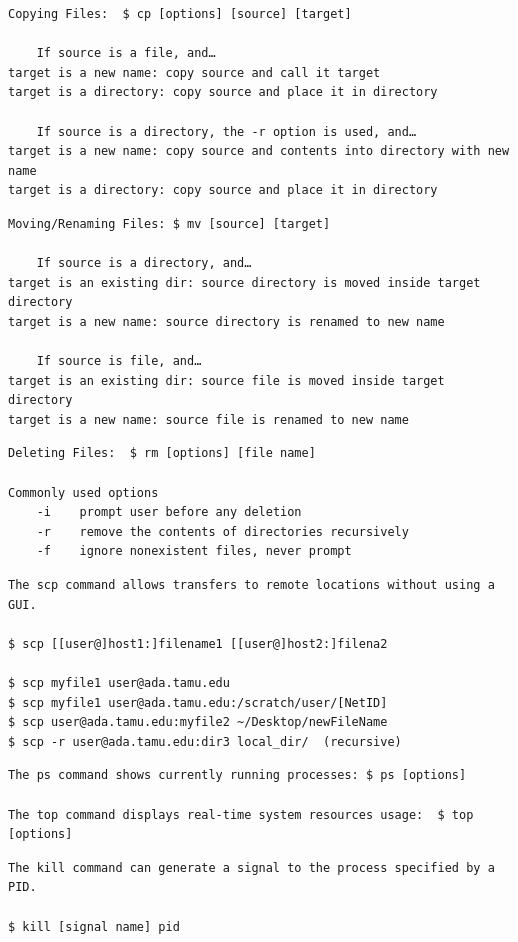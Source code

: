 \begin{verbatim}
Copying Files:  $ cp [options] [source] [target]

	If source is a file, and…
target is a new name: copy source and call it target
target is a directory: copy source and place it in directory

	If source is a directory, the -r option is used, and…
target is a new name: copy source and contents into directory with new name
target is a directory: copy source and place it in directory
\end{verbatim}


\begin{verbatim}
Moving/Renaming Files: $ mv [source] [target]

	If source is a directory, and…
target is an existing dir: source directory is moved inside target directory
target is a new name: source directory is renamed to new name

	If source is file, and…
target is an existing dir: source file is moved inside target directory
target is a new name: source file is renamed to new name
\end{verbatim}


\begin{verbatim}
Deleting Files:  $ rm [options] [file name]

Commonly used options
	-i    prompt user before any deletion
	-r    remove the contents of directories recursively
	-f    ignore nonexistent files, never prompt
\end{verbatim}

\begin{Verbatim}
The scp command allows transfers to remote locations without using a GUI. 

$ scp [[user@]host1:]filename1 [[user@]host2:]filena2

$ scp myfile1 user@ada.tamu.edu
$ scp myfile1 user@ada.tamu.edu:/scratch/user/[NetID]
$ scp user@ada.tamu.edu:myfile2 ~/Desktop/newFileName
$ scp -r user@ada.tamu.edu:dir3 local_dir/  (recursive) 
\end{Verbatim}

\begin{verbatim}
The ps command shows currently running processes: $ ps [options]

The top command displays real-time system resources usage:  $ top [options]
\end{verbatim}


\begin{verbatim}
The kill command can generate a signal to the process specified by a PID.

$ kill [signal name] pid

\end{verbatim}

